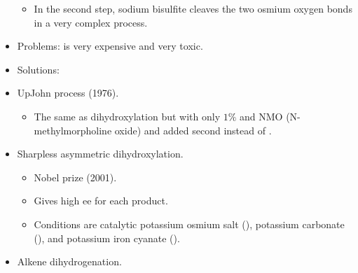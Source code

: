 \documentclass[../notes.tex]{subfiles}
\begin{document}
\begin{itemize}
\begin{itemize}
        \item In the second step, sodium bisulfite cleaves the two osmium oxygen bonds in a very complex process.
    \end{itemize}
    \item Problems:  is very expensive and very toxic.
    \item Solutions:
    \item UpJohn process (1976).
    \begin{itemize}
        \item The same as dihydroxylation but with only $1\%$  and NMO (N-methylmorpholine oxide) and  added second instead of .
    \end{itemize}
    \item Sharpless asymmetric dihydroxylation.
    \begin{itemize}
        \item Nobel prize (2001).
        \item Gives high ee for each product.
        \item Conditions are catalytic potassium osmium salt (), potassium carbonate (), and potassium iron cyanate ().
    \end{itemize}
    \item Alkene dihydrogenation.
\end{itemize}
\end{document}
